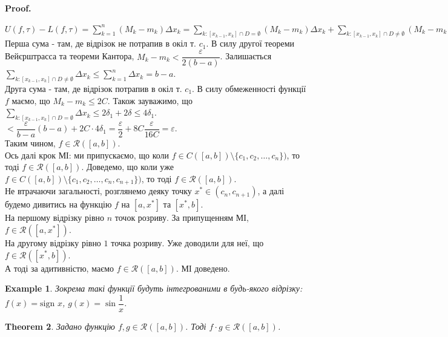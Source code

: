 \documentclass[a4paper, 10pt]{article}
\makeatletter
\def\huge{\displaystyle}
\def\qed{$\blacksquare$}
\theoremstyle{theoremdd}
\newtheorem{theorem}{Theorem}[subsection]
\theoremstyle{theoremdd}
\theoremstyle{theoremdd}
\theoremstyle{theoremdd}
\newtheorem{example}[theorem]{Example}
\theoremstyle{theoremdd}
\theoremstyle{theoremdd}
\theoremstyle{theoremdd}
\theoremstyle{theoremdd}
\renewenvironment{proof}[1][Proof.\\]{\par
\pushQED{\hfill \qed}%
\normalfont \topsep6\p@\@plus6\p@\relax
\trivlist
\item\relax
{\bfseries
#1\@addpunct{.}}\hspace\labelsep\ignorespaces
}{%
\popQED\endtrivlist\@endpefalse
}
\makeatother
\begin{document}
\begin{proof}
\begin{figure}[H]
\end{figure}
$U(f,\tau) - L(f,\tau) = \huge\sum_{k=1}^n (M_k-m_k) \Delta x_k = \huge\sum_{k: [x_{k-1},x_{k}] \cap D = \emptyset} (M_k - m_k) \Delta x_k + \sum_{k: [x_{k-1},x_{k}] \cap D \neq \emptyset} (M_k - m_k) \Delta x_k \boxed{<}$\\
Перша сума - там, де відрізок не потрапив в окіл т. $c_1$. В силу другої теореми Вейєрштрасса та теореми Кантора, $M_k - m_k < \dfrac{\varepsilon}{2(b-a)}$. Залишається $\huge\sum_{k: [x_{k-1},x_{k}] \cap D \neq \emptyset} \Delta x_k \leq \huge\sum_{k=1}^n \Delta x_k = b-a$.\\
Друга сума - там, де відрізок потрапив в окіл т. $c_1$. В силу обмеженності функції $f$ маємо, що $M_k-m_k \leq 2C$. Також зауважимо, що $\huge\sum_{k:[x_{k-1},x_k] \cap D = \emptyset} \Delta x_k \leq 2 \delta_1 + 2 \delta \leq 4\delta_1$.\\
$\boxed{<} \dfrac{\varepsilon}{b-a} (b-a) + 2 C \cdot 4 \delta_1 = \dfrac{\varepsilon}{2} + 8C \dfrac{\varepsilon}{16C} = \varepsilon$.\\
Таким чином, $f \in \mathcal{R}([a,b])$.
\bigskip \\
Ось далі крок МІ: ми припускаємо, що коли $f \in C([a,b]) \setminus \{c_1,c_2,\dots,c_n\})$, то тоді $f \in \mathcal{R}([a,b])$. Доведемо, що коли уже $f \in C([a,b]) \setminus \{c_1,c_2,\dots,c_n,c_{n+1}\})$, то тоді $f \in \mathcal{R}([a,b])$.\\
Не втрачаючи загальності, розглянемо деяку точку $x^* \in (c_n,c_{n+1})$, а далі будемо дивитись на функцію $f$ на $[a,x^*]$ та $[x^*,b]$.\\
На першому відрізку рівно $n$ точок розриву. За припущенням МІ, $f \in \mathcal{R}([a,x^*])$.\\
На другому відрізку рівно $1$ точка розриву. Уже доводили для неї, що $f \in \mathcal{R}([x^*,b])$.\\
А тоді за адитивністю, маємо $f \in \mathcal{R}([a,b])$. МІ доведено.
\end{proof}

\begin{example}
Зокрема такі функції будуть інтегрованими в будь-якого відрізку: $f(x) = \text{sign } x$, $g(x) = \sin \dfrac{1}{x}$.
\end{example}

\begin{theorem}
Задано функцію $f,g \in \mathcal{R}([a,b])$. Тоді $f \cdot g \in \mathcal{R}([a,b])$.
\end{theorem}
\end{document}
